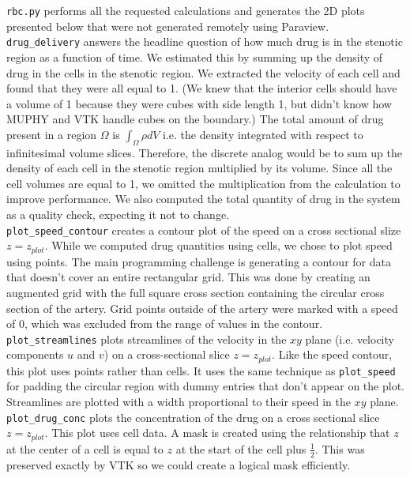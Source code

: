 \documentclass[11pt]{article} %
\newcommand{\tty}[1]{\texttt{#1}}
\begin{document}
\tty{rbc.py} performs all the requested calculations and generates the 2D plots presented 
below that were not generated remotely using Paraview. \\
\tty{drug\_delivery} answers the headline question of how much drug is in the stenotic
region as a function of time.  
We estimated this by summing up the density of drug in the cells in the stenotic region.
We extracted the velocity of each cell and found that they were all equal to 1.
(We knew that the interior cells should have a volume of 1 because they were cubes
with side length 1, but didn't know how MUPHY and VTK handle cubes on the boundary.)
The total amount of drug present in a region $\Omega$ is $\int_{\Omega} \rho dV$
i.e. the density integrated with respect to infinitesimal volume slices.
Therefore, the discrete analog would be to sum up the density of each cell in the stenotic region multiplied by its volume.  
Since all the cell volumes are equal to 1, we omitted the multiplication from the calculation to improve performance.
We also computed the total quantity of drug in the system as a quality check, expecting it not to change.\\
\tty{plot\_speed\_contour} creates a contour plot of the speed on a cross sectional slize $z=z_{plot}$.
While we computed drug quantities using cells, we chose to plot speed using points.
The main programming challenge is generating a contour for data that doesn't cover an entire rectangular grid.
This was done by creating an augmented grid with the full square cross section containing
the circular cross section of the artery.
Grid points outside of the artery were marked with a speed of 0, which was excluded from the
range of values in the contour.\\
\tty{plot\_streamlines} plots streamlines of the velocity in the $xy$ plane
(i.e. velocity components $u$ and $v$) on a cross-sectional slice $z=z_{plot}$.
Like the speed contour, this plot uses points rather than cells.
It uses the same technique as \tty{plot\_speed} for padding the circular region
with dummy entries that don't appear on the plot.
Streamlines are plotted with a width proportional to their speed in the $xy$ plane.\\
\tty{plot\_drug\_conc} plots the concentration of the drug on a cross sectional slice $z=z_{plot}$.
This plot uses cell data.  
A mask is created using the relationship that $z$ at the center of a cell is equal to 
$z$ at the start of the cell plus $\frac{1}{2}$.  
This was preserved exactly by VTK so we could create a logical mask efficiently.
\end{document}
